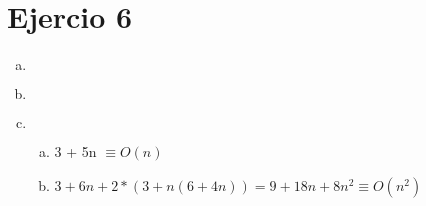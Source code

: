 \documentclass{article}
\begin{document}
\section*{Ejercio 6}

\begin{enumerate}[a)]
    \item $ $
        
    \item $ $
        
    \item $ $
        \begin{enumerate}[a)]
            \item 3 + 5n $\equiv O(n)$
            \item$ 3 + 6n + 2*(3 + n(6 + 4n)) = 9 + 18n + 8n^{2} \equiv O(n^{2})$
        \end{enumerate}
\end{enumerate}
\end{document}
